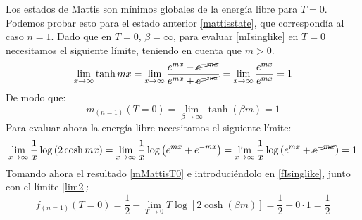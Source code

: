 \documentclass[titlepage,12pt]{article}
\numberwithin{equation}{section}
\begin{document}
	Los estados de Mattis son mínimos globales de la energía libre para $T=0$. Podemos probar esto para el estado anterior \eqref{mattisstate}, que correspondía al caso $n=1$. Dado que en $T=0$, $\beta=\infty$, para evaluar \eqref{mIsinglike} en $T=0$ necesitamos el siguiente límite, teniendo en cuenta que $m>0$.
	\begin{equation}
	\lim_{x\rightarrow\infty}\tanh mx =\lim_{x\rightarrow\infty} \frac{e^{mx} - \cancel{e^{-mx}}}{e^{mx} + \cancel{e^{-mx}}}=\lim_{x\rightarrow\infty} \frac{e^{mx}}{e^{mx}}=1
	\label{lim1}
	\end{equation}
	De modo que:
	\begin{equation}
	m_{(n=1)}(T=0)=\lim_{\beta\rightarrow\infty}\tanh(\beta m)=1
	\label{mMattisT0}
	\end{equation}
	Para evaluar ahora la energía libre necesitamos el siguiente límite:
	\begin{equation}
	\lim_{x\rightarrow\infty}\frac{1}{x}\log\left(2\cosh mx\right)=\lim_{x\rightarrow\infty}\frac{1}{x}\log\left(e^{mx} + e^{-mx}\right)=\lim_{x\rightarrow\infty}\frac{1}{x}\log\left(e^{mx} + \cancel{e^{-mx}}\right)=1
	\label{lim2}
	\end{equation}
	Tomando ahora el resultado \eqref{mMattisT0} e introduciéndolo en \eqref{fIsinglike}, junto con el límite \eqref{lim2}:
	\begin{equation}
	f_{(n=1)}(T=0)=\frac{1}{2}-\lim_{T\rightarrow0}T\log\left[2\cosh(\beta m)\right]=\frac{1}{2} - 0\cdot1=\frac{1}{2}
	\label{fMattisT0}
	\end{equation}
	
\end{document}
